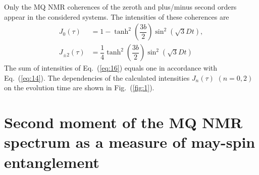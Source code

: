\documentclass[review]{elsarticle}
\begin{document}
Only the MQ NMR coherences of the zeroth and plus/minus second orders appear in the considered systems. 
The intensities of these coherences are
%
\begin{equation}
    \begin{split}
        \label{eq:16}
        J_0(\tau) & = 1 
        - \tanh^2\left( \dfrac{3b}{2} \right)
            \sin^2 \left( \sqrt{3} Dt \right), 
        \\
        J_{\pm2}(\tau) & = \dfrac{1}{4} 
            \tanh^2 \left( \dfrac{3b}{2} \right)
            \sin^2 \left( \sqrt{3} Dt \right)
    \end{split}
\end{equation}
%
The sum of intensities of Eq.~(\ref{eq:16}) equals one in accordance with Eq.~(\ref{eq:14}).
The dependencies of the calculated intensities $J_{n}(\tau)$ $(n=0,2)$ on the evolution time are shown in Fig.~(\ref{fig:1}).



\section{Second moment of the MQ NMR spectrum as a measure of may-spin entanglement}
\label{sec:4}
\end{document}
